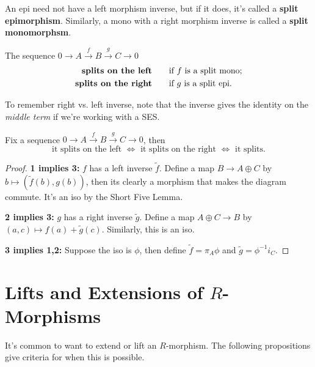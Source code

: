 \documentclass[twoside,10pt]{report}
\begin{document}
An epi need not have a left morphism inverse, but if it does, it's called a \textbf{split epimorphism}. Similarly, a mono with a right morphism inverse is called a \textbf{split monomorphsm}.

\begin{defn}[]
The sequence $0 \to A \stackrel{f}{\to } B \stackrel{g}{\to } C\to 0$
\begin{align*}
	\text{\textbf{splits on the left}} &\qquad \text{if $f$ is a split mono;} \\
	\text{\textbf{splits on the right}} &\qquad \text{if $g$ is a split epi.}
\end{align*}
\end{defn}

\begin{note}[]
To remember right vs. left inverse, note that the inverse gives the identity on the \textit{middle term} if we're working with a SES.
\end{note}

\begin{thrm}
Fix a sequence $0\to A \stackrel{f}{\to } B\stackrel{g}{\to } C\to 0$, then
\[
	\text{it splits on the left } \iff \text{ it splits on the right } \iff \text{ it splits}.
\] 
\end{thrm}
\begin{proof}
	\textbf{1 implies 3:} $f$ has a left inverse $\tilde{f}$. Define a map $B\to A\oplus C$ by $b \mapsto (\tilde{f}(b),g(b))$, then its clearly a morphism that makes the diagram commute. It's an iso by the Short Five Lemma.

	\textbf{2 implies 3:} $g$ has a right inverse $\tilde{g}$. Define a map $A\oplus C\to B$ by $(a,c)\mapsto f(a)+\tilde{g}(c)$. Similarly, this is an iso.

	\textbf{3 implies 1,2:} Suppose the iso is $\phi$, then define $\tilde{f}=\pi_{A}\phi$ and $\tilde{g}=\phi^{-1} i_C$.
\end{proof}

\section{Lifts and Extensions of \texorpdfstring{$R$}{R}-Morphisms}

It's common to want to extend or lift an $R$-morphism. The following propositions give criteria for when this is possible.
\end{document}
